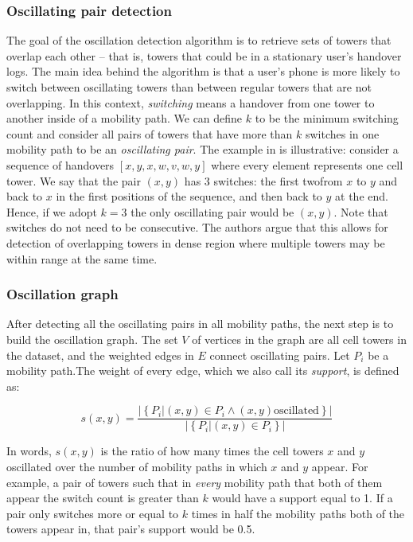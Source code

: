 \documentclass[letterpaper, 11pt, conference]{ieeeconf}
\begin{document}
\subsubsection{Oscillating pair detection}

The goal of the oscillation detection algorithm is to retrieve sets of towers that overlap each other -- that is, towers that could be in a stationary user's handover logs. The main idea behind the algorithm is that a user's phone is more likely to switch between oscillating towers than between regular towers that are not overlapping. In this context, \textit{switching} means a handover from one tower to another inside of a mobility path. We can define $k$ to be the minimum switching count and consider all pairs of towers that have more than $k$ switches in one mobility path to be an \textit{oscillating pair}. The example in \cite{mobilityprofiler} is illustrative: consider a sequence of handovers $\left[x, y, x, w, v, w, y\right]$ where every element represents one cell tower. We say that the pair $(x, y)$ has 3 switches: the first twofrom $x$ to $y$ and back to $x$ in the first positions of the sequence, and then back to $y$ at the end. Hence, if we adopt $k=3$ the only oscillating pair would be $(x, y)$. Note that switches do not need to be consecutive. The authors argue that this allows for detection of overlapping towers in dense region where multiple towers may be within range at the same time.

\subsubsection{Oscillation graph}

After detecting all the oscillating pairs in all mobility paths, the next step is to build the oscillation graph. The set $V$ of vertices in the graph are all cell towers in the dataset, and the weighted edges in $E$ connect oscillating pairs. Let $P_i$ be a mobility path.The weight of every edge, which we also call its \textit{support}, is defined as:

\begin{equation*}
s(x,y) = \frac{|\left\{P_i| (x, y) \in P_i \wedge (x, y) \text{oscillated}\right\}|}{|\left\{P_i| (x, y) \in P_i\right\}|}
\end{equation*}

In words, $s(x,y)$ is the ratio of how many times the cell towers $x$ and $y$ oscillated over the number of mobility paths in which $x$ and $y$ appear. For example, a pair of towers such that in \textit{every} mobility path that both of them appear the switch count is greater than $k$ would have a support equal to 1. If a pair only switches more or equal to $k$ times in half the mobility paths both of the towers appear in, that pair's support would be 0.5.
\end{document}
